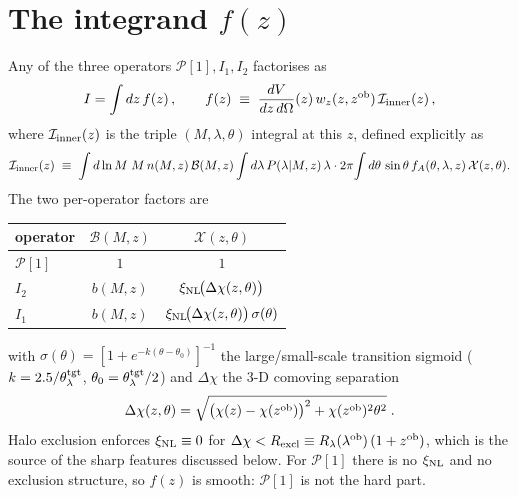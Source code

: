 \documentclass[11pt]{article}
\newcommand{\lob}{\lambda^{\rm ob}}
\newcommand{\zob}{z^{\rm ob}}
\newcommand{\xinl}{\xi_{\rm NL}}
\newcommand{\Pop}{\mathcal{P}}
\begin{document}
\section{The integrand \(f(z)\)}

Any of the three operators \(\Pop[1], I_1, I_2\) factorises as
\begin{equation}
I = \int dz\,f(z)\,,
\qquad
f(z)\;\equiv\;\frac{dV}{dz\,d\Omega}(z)\,w_z(z,\zob)\,
     \mathcal{I}_{\rm inner}(z)\,,
\label{eq:fz_factorisation}
\end{equation}
where \(\mathcal{I}_{\rm inner}(z)\) is the triple
\((M,\lambda,\theta)\) integral at this \(z\), defined explicitly
as
\begin{equation}
\mathcal{I}_{\rm inner}(z)
\;\equiv\;
\int d\ln M\;M\,n(M,z)\,\mathcal{B}(M,z)
\int d\lambda\,P(\lambda|M,z)\,\lambda
\cdot 2\pi\!\int d\theta\,\sin\theta\,
f_A(\theta,\lambda,z)\,\mathcal{X}(z,\theta).
\label{eq:I_inner_def}
\end{equation}
The two per-operator factors are
\begin{center}
\small
\begin{tabular}{lcc}
\toprule
operator & \(\mathcal{B}(M,z)\) & \(\mathcal{X}(z,\theta)\) \\
\midrule
\(\Pop[1]\) & \(1\) & \(1\) \\
\(I_2\)     & \(b(M,z)\) & \(\xinl\!\bigl(\Delta\chi(z,\theta)\bigr)\) \\
\(I_1\)     & \(b(M,z)\) &
                \(\xinl\!\bigl(\Delta\chi(z,\theta)\bigr)\,\sigma(\theta)\) \\
\bottomrule
\end{tabular}
\end{center}
with \(\sigma(\theta)=[1+e^{-k(\theta-\theta_0)}]^{-1}\) the
large/small-scale transition sigmoid (\(k=2.5/\theta_\lambda^{\rm tgt}\),
\(\theta_0=\theta_\lambda^{\rm tgt}/2\)) and \(\Delta\chi\) the 3-D
comoving separation
\[
\Delta\chi(z,\theta)=
\sqrt{\bigl(\chi(z)-\chi(\zob)\bigr)^2+\chi(\zob)^2\theta^2}\;.
\]
Halo exclusion enforces \(\xinl\equiv 0\) for
\(\Delta\chi<R_{\rm excl}\equiv R_\lambda(\lob)\,(1+\zob)\),
which is the source of the sharp features discussed below. For
\(\Pop[1]\) there is no \(\xinl\) and no exclusion structure, so
\(f(z)\) is smooth: \(\Pop[1]\) is not the hard part.
\end{document}
